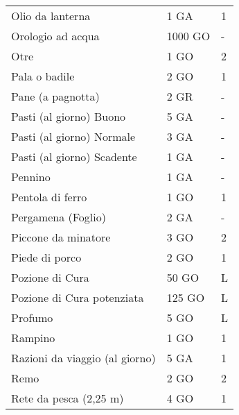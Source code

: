 \documentclass[12pt,a4paper,twoside,openany]{book}
\begin{document}
\begin{multicols}{2}
{\begin{tabularx}{0.42\textwidth}{lll}
Olio da lanterna& 1 GA& 1 \\
Orologio ad acqua & 1000 GO & -\\
Otre  & 1 GO& 2 \\
Pala o badile & 2 GO& 1 \\
Pane (a pagnotta) & 2 GR& -\\
Pasti (al giorno) Buono & 5 GA&-\\
Pasti (al giorno) Normale& 3 GA&-\\
Pasti (al giorno) Scadente  & 1 GA&-\\
Pennino & 1 GA& - \\
Pentola di ferro  & 1 GO& 1 \\
Pergamena (Foglio)  & 2 GA& - \\
Piccone da minatore & 3 GO& 2 \\
Piede di porco& 2 GO& 1 \\
Pozione di Cura & 50 GO & L\\
Pozione di Cura potenziata & 125 GO & L\\
Profumo & 5 GO & L\\
Rampino & 1 GO& 1 \\
Razioni da viaggio (al giorno)  & 5 GA& 1 \\
Remo  & 2 GO& 2\\
Rete da pesca (2,25 m)& 4 GO& 1 \\

\end{tabularx}

}
\end{multicols}
\end{document}
